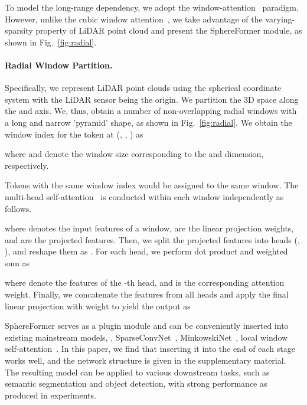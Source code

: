 \documentclass[10pt,twocolumn,letterpaper]{article}
\begin{document}
To model the long-range dependency, we adopt the window-attention~\cite{liu2021Swin} paradigm. However, unlike the cubic window attention~\cite{mao2021voxel,fan2022embracing,lai2022stratified}, we take advantage of the varying-sparsity property of LiDAR point cloud and present the SphereFormer module, as shown in Fig.~\ref{fig:radial}.

\paragraph{Radial Window Partition.} Specifically, we represent LiDAR point clouds using the spherical coordinate system  with the LiDAR sensor being the origin. We partition the 3D space along the  and  axis. We, thus, obtain a number of non-overlapping radial windows with a long and narrow 'pyramid' shape, as shown in Fig.~\ref{fig:radial}. We obtain the window index for the token at (, , ) as

where  and  denote the window size corresponding to the  and  dimension, respectively.

Tokens with the same window index would be assigned to the same window. The multi-head self-attention~\cite{vaswani2017attention} is conducted within each window independently as follows.

where  denotes the input features of a window,  are the linear projection weights, and  are the projected features. Then, we split the projected features  into  heads (\ie, ), and reshape them as . For each head, we perform dot product and weighted sum as


where  denote the features of the -th head, and  is the corresponding attention weight. Finally, we concatenate the features from all heads and apply the final linear projection with weight  to yield the output  as



SphereFormer serves as a plugin module and can be conveniently inserted into existing mainstream models, \eg, SparseConvNet~\cite{3DSemanticSegmentationWithSubmanifoldSparseConvNet,SubmanifoldSparseConvNet}, MinkowskiNet~\cite{choy20194d}, local window self-attention~\cite{mao2021voxel,lai2022stratified,fan2022embracing}. In this paper, we find that inserting it into the end of each stage works well, and the network structure is given in the supplementary material. The resulting model can be applied to various downstream tasks, such as semantic segmentation and object detection, with strong performance as produced in experiments.
\end{document}
